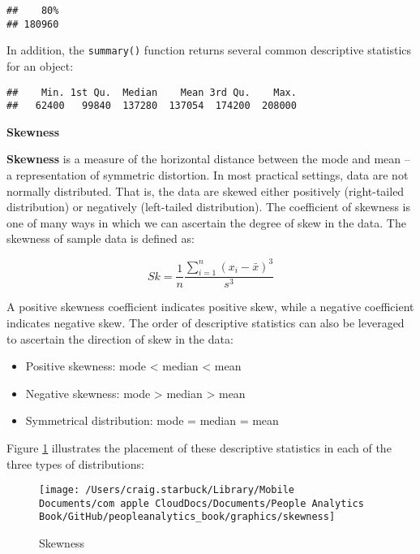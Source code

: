 \documentclass[
]{book}
\newenvironment{Shaded}{\begin{snugshade}}{\end{snugshade}}
\newcommand{\CommentTok}[1]{\textcolor[rgb]{0.56,0.35,0.01}{\textit{#1}}}
\newcommand{\FunctionTok}[1]{\textcolor[rgb]{0.00,0.00,0.00}{#1}}
\newcommand{\NormalTok}[1]{#1}
\newcommand{\SpecialCharTok}[1]{\textcolor[rgb]{0.00,0.00,0.00}{#1}}
\providecommand{\tightlist}{%
  \setlength{\itemsep}{0pt}\setlength{\parskip}{0pt}}
\begin{document}
\begin{verbatim}
##    80% 
## 180960
\end{verbatim}

In addition, the \texttt{summary()} function returns several common descriptive statistics for an object:

\begin{Shaded}
\end{Shaded}

\begin{verbatim}
##    Min. 1st Qu.  Median    Mean 3rd Qu.    Max. 
##   62400   99840  137280  137054  174200  208000
\end{verbatim}

\textbf{Skewness}

\textbf{Skewness} is a measure of the horizontal distance between the mode and mean -- a representation of symmetric distortion. In most practical settings, data are not normally distributed. That is, the data are skewed either positively (right-tailed distribution) or negatively (left-tailed distribution). The coefficient of skewness is one of many ways in which we can ascertain the degree of skew in the data. The skewness of sample data is defined as:

\[ Sk = \frac{1}{n} \frac{\displaystyle\sum_{i=1}^{n} (x_i-\bar{x})^3}{s^3} \]

A positive skewness coefficient indicates positive skew, while a negative coefficient indicates negative skew. The order of descriptive statistics can also be leveraged to ascertain the direction of skew in the data:

\begin{itemize}
\tightlist
\item
  Positive skewness: mode \textless{} median \textless{} mean
\item
  Negative skewness: mode \textgreater{} median \textgreater{} mean
\item
  Symmetrical distribution: mode = median = mean
\end{itemize}

Figure \ref{fig:skewness} illustrates the placement of these descriptive statistics in each of the three types of distributions:

\begin{figure}

{\centering \texttt{[image: /Users/craig.starbuck/Library/Mobile Documents/com~apple~CloudDocs/Documents/People Analytics Book/GitHub/peopleanalytics\_book/graphics/skewness]} 

}

\caption{Skewness}\label{fig:skewness}
\end{figure}
\end{document}
